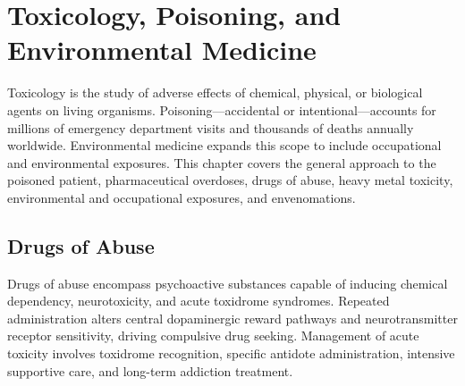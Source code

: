 \chapter{Toxicology, Poisoning, and Environmental Medicine}
\label{ch:toxicology}
Toxicology is the study of adverse effects of chemical, physical, or biological agents on living organisms. Poisoning---accidental or intentional---accounts for millions of emergency department visits and thousands of deaths annually worldwide. Environmental medicine expands this scope to include occupational and environmental exposures. This chapter covers the general approach to the poisoned patient, pharmaceutical overdoses, drugs of abuse, heavy metal toxicity, environmental and occupational exposures, and envenomations.

\section{Drugs of Abuse}




Drugs of abuse encompass psychoactive substances capable of inducing chemical dependency, neurotoxicity, and acute toxidrome syndromes. Repeated administration alters central dopaminergic reward pathways and neurotransmitter receptor sensitivity, driving compulsive drug seeking. Management of acute toxicity involves toxidrome recognition, specific antidote administration, intensive supportive care, and long-term addiction treatment.





\label{sec:Drugs of Abuse}

